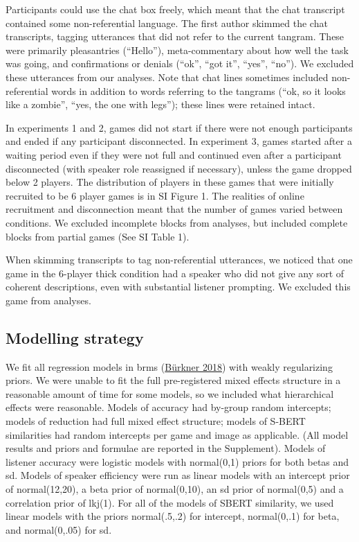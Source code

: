 \documentclass[
  english,
]{article}
\begin{document}
Participants could use the chat box freely, which meant that the chat transcript contained some non-referential language. The first author skimmed the chat transcripts, tagging utterances that did not refer to the current tangram. These were primarily pleasantries (``Hello''), meta-commentary about how well the task was going, and confirmations or denials (``ok'', ``got it'', ``yes'', ``no''). We excluded these utterances from our analyses. Note that chat lines sometimes included non-referential words in addition to words referring to the tangrams (``ok, so it looks like a zombie'', ``yes, the one with legs''); these lines were retained intact.

In experiments 1 and 2, games did not start if there were not enough participants and ended if any participant disconnected. In experiment 3, games started after a waiting period even if they were not full and continued even after a participant disconnected (with speaker role reassigned if necessary), unless the game dropped below 2 players. The distribution of players in these games that were initially recruited to be 6 player games is in SI Figure 1. The realities of online recruitment and disconnection meant that the number of games varied between conditions. We excluded incomplete blocks from analyses, but included complete blocks from partial games (See SI Table 1).

When skimming transcripts to tag non-referential utterances, we noticed that one game in the 6-player thick condition had a speaker who did not give any sort of coherent descriptions, even with substantial listener prompting. We excluded this game from analyses.

\hypertarget{modelling-strategy}{%
\subsection{Modelling strategy}\label{modelling-strategy}}

We fit all regression models in brms (\protect\hyperlink{ref-burkner2018}{Bürkner 2018}) with weakly regularizing priors.
We were unable to fit the full pre-registered mixed effects structure in a reasonable amount of time for some models, so we included what hierarchical effects were reasonable. Models of accuracy had by-group random intercepts; models of reduction had full mixed effect structure; models of S-BERT similarities had random intercepts per game and image as applicable. (All model results and priors and formulae are reported in the Supplement).
Models of listener accuracy were logistic models with normal(0,1) priors for both betas and sd.
Models of speaker efficiency were run as linear models with an intercept prior of normal(12,20), a beta prior of normal(0,10), an sd prior of normal(0,5) and a correlation prior of lkj(1).
For all of the models of SBERT similarity, we used linear models with the priors normal(.5,.2) for intercept, normal(0,.1) for beta, and normal(0,.05) for sd.
\end{document}
